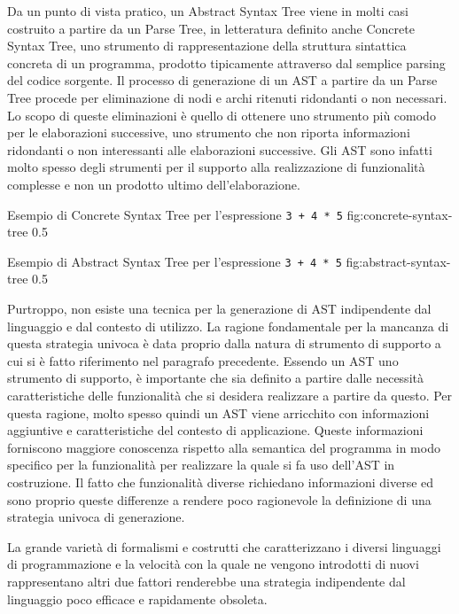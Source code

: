 Da un punto di vista pratico, un Abstract Syntax Tree viene in molti casi
costruito a partire da un Parse Tree, in letteratura definito anche Concrete
Syntax Tree, uno strumento di rappresentazione della struttura sintattica
concreta di un programma, prodotto tipicamente attraverso dal semplice parsing
del codice sorgente. Il processo di generazione di un AST a partire da un Parse
Tree procede per eliminazione di nodi e archi ritenuti ridondanti o non
necessari. Lo scopo di queste eliminazioni è quello di ottenere uno strumento
più comodo per le elaborazioni successive, uno strumento che non riporta
informazioni ridondanti o non interessanti alle elaborazioni successive. Gli
AST sono infatti molto spesso degli strumenti per il supporto alla
realizzazione di funzionalità complesse e non un prodotto ultimo
dell’elaborazione.

    {Esempio di Concrete Syntax Tree per l'espressione \texttt{3 + 4 * 5}}
      {fig:concrete-syntax-tree}
      {0.5}

    {Esempio di Abstract Syntax Tree per l'espressione \texttt{3 + 4 * 5}}
      {fig:abstract-syntax-tree}
      {0.5}

Purtroppo, non esiste una tecnica per la generazione di AST indipendente dal
linguaggio e dal contesto di utilizzo. La ragione fondamentale per la mancanza
di questa strategia univoca è data proprio dalla natura di strumento di
supporto a cui si è fatto riferimento nel paragrafo precedente. Essendo un AST
uno strumento di supporto, è importante che sia definito a partire dalle
necessità caratteristiche delle funzionalità che si desidera realizzare a
partire da questo. Per questa ragione, molto spesso quindi un AST viene
arricchito con informazioni aggiuntive e caratteristiche del contesto di
applicazione. Queste informazioni forniscono maggiore conoscenza rispetto alla
semantica del programma in modo specifico per la funzionalità per realizzare la
quale si fa uso dell’AST in costruzione. Il fatto che funzionalità diverse
richiedano informazioni diverse ed sono proprio queste differenze a rendere
poco ragionevole la definizione di una strategia univoca di generazione.

La grande varietà di formalismi e costrutti che caratterizzano i diversi
linguaggi di programmazione e la velocità con la quale ne vengono introdotti di
nuovi rappresentano altri due fattori renderebbe una strategia indipendente dal
linguaggio poco efficace e rapidamente obsoleta.\\

